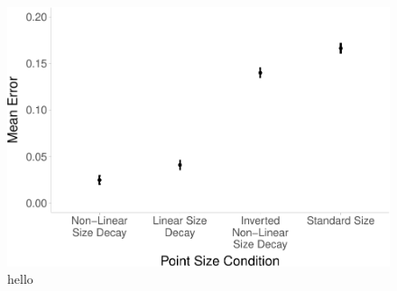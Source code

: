 \documentclass{vgtc}                          %
\begin{document}
\begin{figure}

{\centering \includegraphics{size_and_scatterplots_files/figure-latex/dot-plot-1} 

}

\caption{hello}\label{fig:dot-plot}
\end{figure}


%

%
%
%


\end{document}
